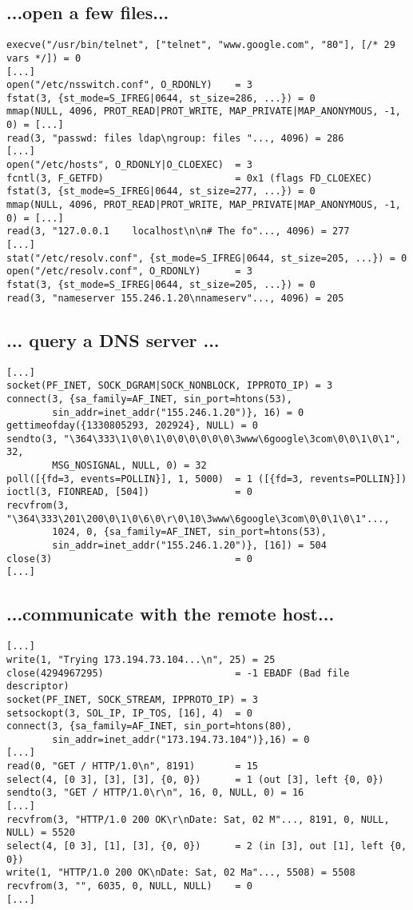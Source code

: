\documentclass[xga]{xdvislides}
\begin{document}
\subsection{...open a few files...}
\begin{verbatim}
execve("/usr/bin/telnet", ["telnet", "www.google.com", "80"], [/* 29 vars */]) = 0
[...]
open("/etc/nsswitch.conf", O_RDONLY)    = 3
fstat(3, {st_mode=S_IFREG|0644, st_size=286, ...}) = 0
mmap(NULL, 4096, PROT_READ|PROT_WRITE, MAP_PRIVATE|MAP_ANONYMOUS, -1, 0) = [...]
read(3, "passwd: files ldap\ngroup: files "..., 4096) = 286
[...]
open("/etc/hosts", O_RDONLY|O_CLOEXEC)  = 3
fcntl(3, F_GETFD)                       = 0x1 (flags FD_CLOEXEC)
fstat(3, {st_mode=S_IFREG|0644, st_size=277, ...}) = 0
mmap(NULL, 4096, PROT_READ|PROT_WRITE, MAP_PRIVATE|MAP_ANONYMOUS, -1, 0) = [...]
read(3, "127.0.0.1    localhost\n\n# The fo"..., 4096) = 277
[...]
stat("/etc/resolv.conf", {st_mode=S_IFREG|0644, st_size=205, ...}) = 0
open("/etc/resolv.conf", O_RDONLY)      = 3
fstat(3, {st_mode=S_IFREG|0644, st_size=205, ...}) = 0
read(3, "nameserver 155.246.1.20\nnameserv"..., 4096) = 205
\end{verbatim}

\subsection{... query a DNS server ...}
\begin{verbatim}
[...]
socket(PF_INET, SOCK_DGRAM|SOCK_NONBLOCK, IPPROTO_IP) = 3
connect(3, {sa_family=AF_INET, sin_port=htons(53),
        sin_addr=inet_addr("155.246.1.20")}, 16) = 0
gettimeofday({1330805293, 202924}, NULL) = 0
sendto(3, "\364\333\1\0\0\1\0\0\0\0\0\0\3www\6google\3com\0\0\1\0\1", 32,
        MSG_NOSIGNAL, NULL, 0) = 32
poll([{fd=3, events=POLLIN}], 1, 5000)  = 1 ([{fd=3, revents=POLLIN}])
ioctl(3, FIONREAD, [504])               = 0
recvfrom(3, "\364\333\201\200\0\1\0\6\0\r\0\10\3www\6google\3com\0\0\1\0\1"...,
        1024, 0, {sa_family=AF_INET, sin_port=htons(53),
        sin_addr=inet_addr("155.246.1.20")}, [16]) = 504
close(3)                                = 0
[...]
\end{verbatim}

\subsection{...communicate with the remote host...}
\begin{verbatim}
[...]
write(1, "Trying 173.194.73.104...\n", 25) = 25
close(4294967295)                       = -1 EBADF (Bad file descriptor)
socket(PF_INET, SOCK_STREAM, IPPROTO_IP) = 3
setsockopt(3, SOL_IP, IP_TOS, [16], 4)  = 0
connect(3, {sa_family=AF_INET, sin_port=htons(80),
        sin_addr=inet_addr("173.194.73.104")},16) = 0
[...]
read(0, "GET / HTTP/1.0\n", 8191)       = 15
select(4, [0 3], [3], [3], {0, 0})      = 1 (out [3], left {0, 0})
sendto(3, "GET / HTTP/1.0\r\n", 16, 0, NULL, 0) = 16
[...]
recvfrom(3, "HTTP/1.0 200 OK\r\nDate: Sat, 02 M"..., 8191, 0, NULL, NULL) = 5520
select(4, [0 3], [1], [3], {0, 0})      = 2 (in [3], out [1], left {0, 0})
write(1, "HTTP/1.0 200 OK\nDate: Sat, 02 Ma"..., 5508) = 5508
recvfrom(3, "", 6035, 0, NULL, NULL)    = 0
[...]
\end{verbatim}
\end{document}
